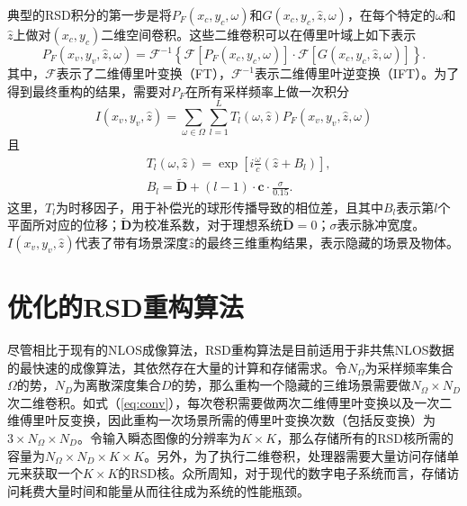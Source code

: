 \documentclass[master]{shtthesis}             %
\begin{document}
典型的RSD积分的第一步是将$P_F(x_c,y_c,\omega)$和$G(x_c,y_c,\hat{z},\omega)$，在每个特定的$\omega$和$\hat{z}$上做对$(x_c,y_c)$二维空间卷积。这些二维卷积可以在傅里叶域上如下表示
\begin{equation}\label{eq:conv}
  P_F(x_v, y_v, \hat{z}, \omega) = \mathcal{F}^{-1}\left\{\mathcal{F}\left[P_F(x_c, y_c, \omega)\right]\cdot \mathcal{F}\left[G(x_c, y_c, \hat{z}, \omega)\right]\right\}.
\end{equation}
其中，$\mathcal{F}$表示了二维傅里叶变换（FT），$\mathcal{F}^{-1}$表示二维傅里叶逆变换（IFT）。为了得到最终重构的结果，需要对$P_F$在所有采样频率上做一次积分
\begin{equation}
  I(x_v, y_v, \hat{z}) = \sum_{\omega \in  {\Omega}}\sum_{l=1}^{L} T_l(\omega, \hat{z}) P_F(x_v, y_v, \hat{z}, \omega)
\end{equation}
且
\begin{align}
    &T_l(\omega, \hat{z}) = \exp\left[i\frac{\omega}{c}(\hat{z}+B_l)\right],\label{eq:ts} \\
    &B_l =\tilde{\mathbf{D}} + (l-1)\cdot \mathbf{c}\cdot \frac{\sigma}{0.15}.
\end{align}
这里，$T_l$为时移因子，用于补偿光的球形传播导致的相位差，且其中$B_l$表示第$l$个平面所对应的位移；$\tilde{\mathbf{D}}$为校准系数，对于理想系统$\tilde{\mathbf{D}}=0$；$\sigma$表示脉冲宽度。$I(x_v,y_v,\hat{z})$代表了带有场景深度$\hat{z}$的最终三维重构结果，表示隐藏的场景及物体。

\section{优化的RSD重构算法}

尽管相比于现有的NLOS成像算法，RSD重构算法是目前适用于非共焦NLOS数据的最快速的成像算法，其依然存在大量的计算和存储需求。令$N_\Omega$为采样频率集合$\Omega$的势，$N_D$为离散深度集合$D$的势，那么重构一个隐藏的三维场景需要做$N_\Omega\times N_D$次二维卷积。如式（\ref{eq:conv}），每次卷积需要做两次二维傅里叶变换以及一次二维傅里叶反变换，因此重构一次场景所需的傅里叶变换次数（包括反变换）为$3\times N_\Omega \times N_D$。令输入瞬态图像的分辨率为$K\times K$，那么存储所有的RSD核所需的容量为$N_\Omega\times N_D\times K\times K$。另外，为了执行二维卷积，处理器需要大量访问存储单元来获取一个$K\times K$的RSD核。众所周知，对于现代的数字电子系统而言，存储访问耗费大量时间和能量从而往往成为系统的性能瓶颈\citep{hennessy2011computer}。
\end{document}

